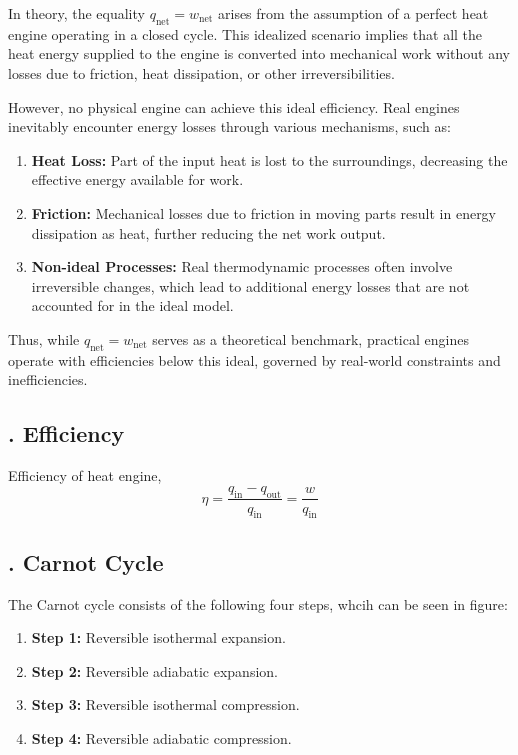 \documentclass[fleqn,10pt]{SelfArx} %
\begin{document}
In theory, the equality \( q_{\text{net}} = w_{\text{net}} \) arises from the assumption of a perfect heat engine operating in a closed cycle. This idealized scenario implies that all the heat energy supplied to the engine is converted into mechanical work without any losses due to friction, heat dissipation, or other irreversibilities.

However, no physical engine can achieve this ideal efficiency. Real engines inevitably encounter energy losses through various mechanisms, such as:

\begin{enumerate}
    \item \textbf{Heat Loss:} Part of the input heat is lost to the surroundings, decreasing the effective energy available for work.
    \item \textbf{Friction:} Mechanical losses due to friction in moving parts result in energy dissipation as heat, further reducing the net work output.
    \item \textbf{Non-ideal Processes:} Real thermodynamic processes often involve irreversible changes, which lead to additional energy losses that are not accounted for in the ideal model.
\end{enumerate}

Thus, while \( q_{\text{net}} = w_{\text{net}} \) serves as a theoretical benchmark, practical engines operate with efficiencies below this ideal, governed by real-world constraints and inefficiencies.

\subsection{. Efficiency}
Efficiency of heat engine,
\begin{equation}
\eta = \frac{q_\text{in}-q_{\text{out}}}{q_{\text{in}}} = \frac{w}{q_{\text{in}}}
    \label{eq:effiency}
\end{equation}

\subsection{. Carnot Cycle}

The Carnot cycle consists of the following four steps, whcih can be seen in figure:
\begin{enumerate}[noitemsep]
    \item \textbf{Step 1:} Reversible isothermal expansion.
    \item \textbf{Step 2:} Reversible adiabatic expansion.
    \item \textbf{Step 3:} Reversible isothermal compression.
    \item \textbf{Step 4:} Reversible adiabatic compression.
\end{enumerate}
\end{document}
